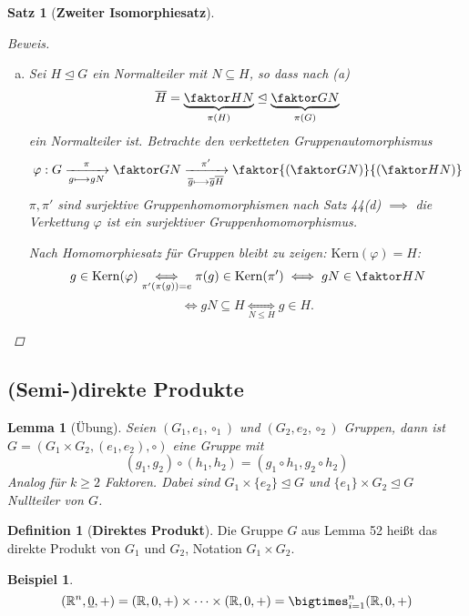 \documentclass[a4paper]{report}
\theoremstyle{plain}
\newtheorem{lemm}[thm]{Lemma}
\newtheorem{satz}[thm]{Satz}
\theoremstyle{definition}
\newtheorem{defi}[thm]{Definition}
\newtheorem*{bsp*}{Beispiel}
\begin{document}
\begin{satz}[\textbf{Zweiter Isomorphiesatz}]
\begin{proof}[Beweis]
\begin{enumerate}[(a)]
\begin{itemize}
  \item Schließlich: Sei $H \in X$, zu zeigen ist $H \trianglelefteq G \iff \pi(H) \trianglelefteq \faktor GN$
        $$H \trianglelefteq G \iff \forall g \in G : gHg^{-1} \subseteq H$$
        $$\underset{\pi: G \to \overline G \text{ surj.}}\implies \forall \overline g \in \faktor GN: \overline g \pi(H)\overline g \subseteq \pi(H) \implies \pi(H) \trianglelefteq \overline G$$
        Umgekehrt: Falls $\pi(H) \trianglelefteq \trianglelefteq \overline G$ und $g \in G$:
        $$\pi(gHg^{-1}) = \overline g\pi(H)\overline g^{-1} \le \pi(H)$$
        $$\implies gHg^{-1} \subseteq \pi^{-1}(\pi(gHg^{-1})) \subseteq \pi^{-1}(\pi(H)) \underset{\nu \circ \psi = \mathrm{id}_{X}} = H$$
\end{itemize}
    \item Sei $H \trianglelefteq G$ ein Normalteiler mit $N \subseteq H$, so dass nach (a)
          $$\overline H = \underbrace{\faktor HN}_{\pi(H)} \trianglelefteq \underbrace{\faktor GN}_{\pi(G)}$$
          ein Normalteiler ist. Betrachte den verketteten Gruppenautomorphismus
          $$\varphi : G \xrightarrow[g \longmapsto gN]{\pi}\faktor GN \xrightarrow[\overline g \longmapsto \overline g \overline H]{\pi'} \faktor{\left(\faktor GN\right)}{\left(\faktor HN\right)}$$
          $\pi, \pi'$ sind surjektive Gruppenhomomorphismen nach Satz 44(d) $\implies$ die Verkettung $\varphi$ ist ein surjektiver Gruppenhomomorphismus.

          Nach Homomorphiesatz für Gruppen bleibt zu zeigen: $\mathrm{Kern}(\varphi) = H$:
          $$g \in \mathrm{Kern}(\varphi) \underset{\pi'(\pi(g))=e}\iff\pi(g) \in \mathrm{Kern}(\pi') \iff gN \in \faktor HN$$
          $$\iff gN \subseteq H \underset{N \le H}\iff g \in H.$$
  \end{enumerate}
\end{proof}
\end{satz}

\subsection*{(Semi-)direkte Produkte}%
\label{sec:Direkte Produkte}
\begin{lemm}[Übung]
  Seien $(G_{1}, e_{1}, \circ_{1})$ und $(G_{2}, e_{2}, \circ_{2})$ Gruppen, dann ist $G = (G_{1} \times G_{2}, (e_{1}, e_{2}), \circ)$ eine Gruppe mit
  $$(g_{1}, g_{2}) \circ (h_{1}, h_{2}) = (g_{1} \circ h_{1}, g_{2} \circ h_{2})$$
  Analog für $k \ge 2$ Faktoren. Dabei sind $G_{1} \times \{e_{2}\} \trianglelefteq G$ und $\{e_{1}\} \times G_{2} \trianglelefteq G$ Nullteiler von $G$.
\end{lemm}
\begin{defi}[\textbf{Direktes Produkt}] Die Gruppe $G$ aus Lemma 52 heißt das direkte Produkt von $G_{1}$ und $G_{2}$, Notation $G_{1} \times G_{2}$.
\end{defi}
\begin{bsp*}
$$(\Bbb R^{n}, \underline 0, +) = (\Bbb R, 0, +) \times \cdots \times (\Bbb R, 0, +) = \bigtimes_{i = 1}^{n}(\Bbb R, 0, +)$$
\end{bsp*}
\end{document}
